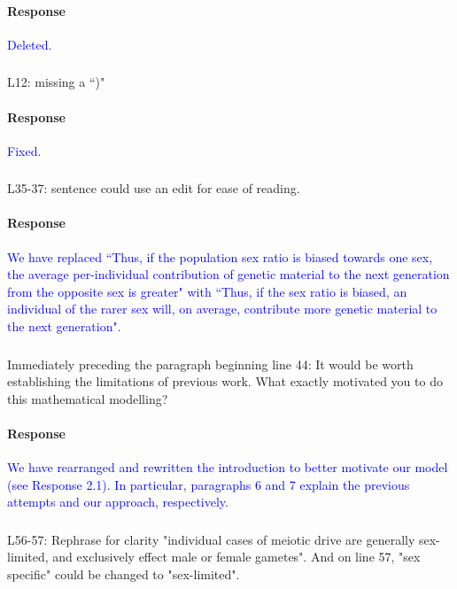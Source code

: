 \documentclass[10pt,letterpaper]{article}
\begin{document}
\noindent\paragraph{Response}
\textcolor{blue}{Deleted.}

\noindent\subsubsection{}
L12: missing a ``)"

\noindent\paragraph{Response}
\textcolor{blue}{Fixed.}

\noindent\subsubsection{}
L35-37: sentence could use an edit for ease of reading.

\noindent\paragraph{Response}
\textcolor{blue}{We have replaced ``Thus, if the population sex ratio is biased towards one sex, the average per-individual contribution of genetic material to the next generation from the opposite sex is greater" with ``Thus, if the sex ratio is biased, an individual of the rarer sex will, on average, contribute more genetic material to the next generation".}

\noindent\subsubsection{}
Immediately preceding the paragraph beginning line 44: It would be worth establishing the limitations of previous work. What exactly motivated you to do this mathematical modelling?

\noindent\paragraph{Response}
\textcolor{blue}{We have rearranged and rewritten the introduction to better motivate our model (see Response 2.1). In particular, paragraphs 6 and 7 explain the previous attempts and our approach, respectively.}

\noindent\subsubsection{}
L56-57: Rephrase for clarity "individual cases of meiotic drive are generally sex-limited, and exclusively effect male or female gametes". And on line 57, "sex specific" could be changed to "sex-limited".
\end{document}

